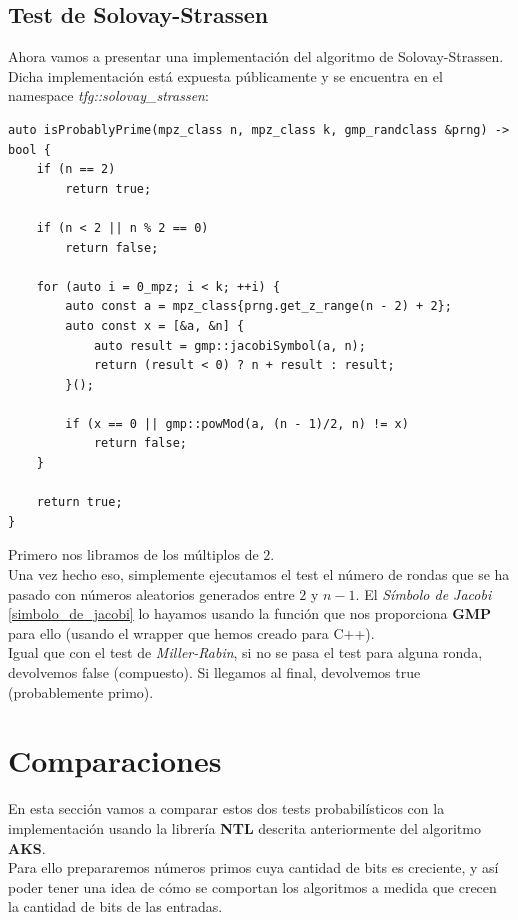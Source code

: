 \subsection{Test de Solovay-Strassen}

Ahora vamos a presentar una implementación del algoritmo de Solovay-Strassen. Dicha implementación está expuesta públicamente y se encuentra en el namespace \textit{tfg::solovay\_strassen}:\\

\begin{lstlisting}
auto isProbablyPrime(mpz_class n, mpz_class k, gmp_randclass &prng) -> bool {
	if (n == 2)
		return true;
	
	if (n < 2 || n % 2 == 0)
		return false;
	
	for (auto i = 0_mpz; i < k; ++i) {
		auto const a = mpz_class{prng.get_z_range(n - 2) + 2};
		auto const x = [&a, &n] {
			auto result = gmp::jacobiSymbol(a, n);
			return (result < 0) ? n + result : result;
		}();
		
		if (x == 0 || gmp::powMod(a, (n - 1)/2, n) != x)
			return false;
	}
	
	return true;
}
\end{lstlisting}

Primero nos libramos de los múltiplos de $2$.\\

Una vez hecho eso, simplemente ejecutamos el test el número de rondas que se ha pasado con números aleatorios generados entre $2$ y $n-1$. El \textit{Símbolo de Jacobi} \ref{simbolo_de_jacobi} lo hayamos usando la función que nos proporciona \textbf{GMP} para ello (usando el wrapper que hemos creado para C++).\\

Igual que con el test de \textit{Miller-Rabin}, si no se pasa el test para alguna ronda, devolvemos false (compuesto). Si llegamos al final, devolvemos true (probablemente primo).

\section{Comparaciones}

En esta sección vamos a comparar estos dos tests probabilísticos con la implementación usando la librería \textbf{NTL} descrita anteriormente del algoritmo \textbf{AKS}.\\

Para ello prepararemos números primos cuya cantidad de bits es creciente, y así poder tener una idea de cómo se comportan los algoritmos a medida que crecen la cantidad de bits de las entradas.\\

